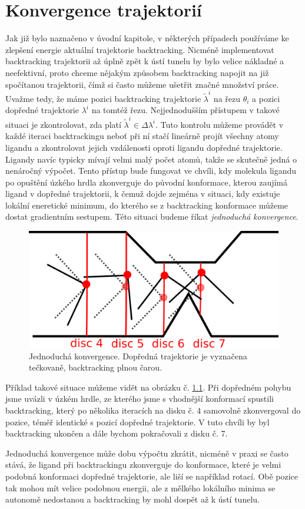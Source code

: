\chapter{Konvergence trajektorií}
Jak již bylo naznačeno v úvodní kapitole, v některých případech používáme ke
zlepšení energie aktuální trajektorie backtracking. Nicméně implementovat
backtracking trajektorii až úplně zpět k ústí tunelu by bylo velice nákladné
a neefektivní, proto chceme nějakým způsobem backtracking napojit na již
spočítanou trajektorii, čímž si často můžeme ušetřit značné množství práce.
Uvažme tedy, že máme pozici backtracking trajektorie $ \tilde{\lambda}^i $
na řezu $ \theta_i $ a pozici dopředné trajektorie $ \lambda^i $ na tomtéž řezu.
Nejjednodušším přístupem v takové situaci je zkontrolovat, zda platí
$ \tilde{\lambda}^i \in \Delta \lambda^i $. Tuto kontrolu můžeme provádět v každé
iteraci backtrackingu neboť při ní stačí lineárně projít všechny atomy ligandu
a zkontrolovat jejich vzdálenosti oproti ligandu dopředné trajektorie. Ligandy
navíc typicky mívají velmi malý počet atomů, takže se skutečně jedná o nenáročný
výpočet. Tento přístup bude fungovat ve chvíli, kdy molekula ligandu po opuštění
úzkého hrdla zkonverguje do původní konformace, kterou zaujímá ligand v dopředné
trajektorii, k čemuž dojde zejména v situaci, kdy existuje lokální eneretické
minimum, do kterého se z backtracking konformace můžeme dostat gradientním sestupem.
Této situaci budeme říkat \textit{jednoduchá konvergence}.

\begin{figure}[ht]
\centering
\includegraphics[width=.5\hsize]{img/backtracking_simple.png}
\caption{Jednoduchá konvergence. Dopředná trajektorie je vyznačena tečkovaně,
backtracking plnou čarou.
}
\label{fig:simple_convergence}
\end{figure}


Příklad takové situace můžeme vidět na obrázku č. \ref{fig:simple_convergence}.
Při dopředném pohybu jsme uvázli v úzkém hrdle, ze kterého jsme s vhodnější
konformací spustili backtracking, který po několika iteracích na disku č. 4
samovolně zkonvergoval do pozice, téměř identické s pozicí dopředné trajektorie.
V tuto chvíli by byl backtracking ukončen a dále bychom pokračovali z disku č. 7.

Jednoduchá konvergence může dobu výpočtu zkrátit, nicméně v praxi se často stává,
že ligand při backtrackingu zkonverguje do konformace, které je velmi podobná
konformaci dopředné trajektorie, ale liší se například rotací. Obě pozice tak
mohou mít velice podobnou energii, ale z mělkého lokálního minima se autonomě
nedostanou a backtracking by mohl dospět až k ústí tunelu.
